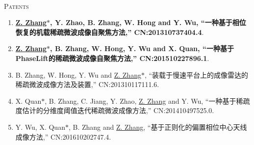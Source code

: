 \documentclass[paper=a4,fontsize=11pt]{scrartcl}
\begin{document}
~\\
\textsc{Patents}

\begin{enumerate}
	
	\item \textbf{\underline{Z. Zhang$\ast$}, Y. Zhao, B. Zhang, W. Hong and Y. Wu, ``一种基于相位恢复的机载稀疏微波成像自聚焦方法,'' CN:201310737404.4}.
	
	\item \textbf{\underline{Z. Zhang$\ast$}, B. Zhang, W. Hong, Y. Wu and X. Quan, ``一种基于PhaseLift的稀疏微波成像自聚焦方法,'' CN:201510227896.1}.
	
	\item B. Zhang, W. Hong, Y. Wu and \underline{Z. Zhang$\ast$}, ``装载于慢速平台上的成像雷达的稀疏微波成像方法及装置,'' CN:201310117111.6.
	
	\item X. Quan$\ast$, B. Zhang, C. Jiang, Y. Zhao, \underline{Z. Zhang} and Y. Wu, ``一种基于稀疏度估计的分维度阈值迭代稀疏微波成像方法,'' CN:201410497525.0.
	
	\item Y. Wu, X. Quan$\ast$, B. Zhang and \underline{Z. Zhang}, ``基于正则化的偏置相位中心天线成像方法,'' CN:201610202747.4.
	
\end{enumerate}
\end{document}
